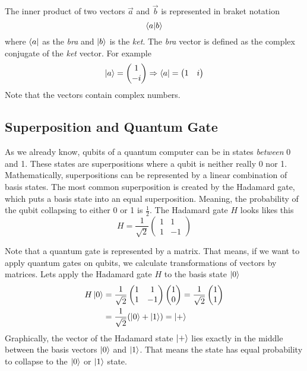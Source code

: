 The inner product of two vectors $\vec a$ and $\vec b$ is represented in braket notation
\begin{equation}
    \braket{a | b}
\end{equation}
where $\bra a$ as the \textit{bra} and $\ket b$ is the \textit{ket}.
The \textit{bra} vector is defined as the complex conjugate of the \textit{ket} vector. 
For example
\begin{equation}
  \ket a=  \begin{pmatrix}1\\-i\end{pmatrix}  \Rightarrow \bra a = \begin{pmatrix}1 & i\end{pmatrix}
\end{equation}
Note that the vectors contain complex numbers.

\subsection{Superposition and Quantum Gate}
As we already know, qubits of a quantum computer can be in states \textit{between} 0 and 1. 
These states are superpositions where a qubit is neither really 0 nor 1.
Mathematically, superpositions can be represented by a linear combination of basis states. 
The most common superposition is created by the Hadamard gate, which puts a basis state into an equal superposition. 
Meaning, the probability of the qubit collapsing to either 0 or 1 is $\frac 1 2$.
The Hadamard gate $H$ looks likes this
\begin{equation}
    H = \frac{1}{\sqrt{2}} \begin{pmatrix}1 & 1\\ 1 & -1\end{pmatrix}  
\end{equation}

Note that a quantum gate is represented by a matrix.
That means, if we want to apply quantum gates on qubits, we calculate transformations of vectors by matrices. 
Lets apply the Hadamard gate $H$ to the basis state $\ket 0$
\begin{equation}
   \begin{split}
   H \ket 0 &=  \frac{1}{\sqrt{2}} \begin{pmatrix}1 & 1\\ 1 & -1\end{pmatrix} \begin{pmatrix}1\\0\end{pmatrix}   
    =  \frac{1}{\sqrt{2}} \begin{pmatrix}1\\1\end{pmatrix}   \\
    &=  \frac{1}{\sqrt{2}} (\ket 0 + \ket 1)  = \ket +
   \end{split}
\end{equation}
Graphically, the vector of the Hadamard state $\ket +$ lies exactly in the middle between the basis vectors $\ket 0$ and $\ket 1$.
That means the state has equal probability to collapse to the $\ket 0$ or $\ket 1$ state.



